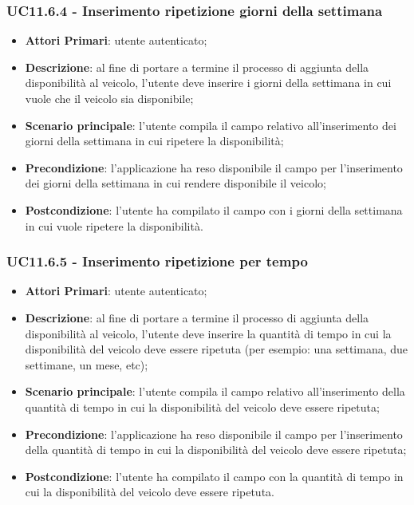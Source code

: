 \subsubsection{UC11.6.4 - Inserimento ripetizione giorni della settimana}
\begin{itemize}
	\item \textbf{Attori Primari}: utente autenticato;
	\item \textbf{Descrizione}: al fine di portare a termine il processo di aggiunta della disponibilità al veicolo, l'utente deve inserire i giorni della settimana in cui vuole che il veicolo sia disponibile;
	\item \textbf{Scenario principale}: l'utente compila il campo relativo all'inserimento dei giorni della settimana in cui ripetere la disponibilità;	
	\item \textbf{Precondizione}: l'applicazione ha reso disponibile il campo per l'inserimento dei giorni della settimana in cui rendere disponibile il veicolo;
	\item \textbf{Postcondizione}: l'utente ha compilato il campo con i giorni della settimana in cui vuole ripetere la disponibilità.	
\end{itemize}
\subsubsection{UC11.6.5 - Inserimento ripetizione per tempo}
\begin{itemize}
	\item \textbf{Attori Primari}: utente autenticato;
	\item \textbf{Descrizione}: al fine di portare a termine il processo di aggiunta della disponibilità al veicolo, l'utente deve inserire la quantità di tempo in cui la disponibilità del veicolo deve essere ripetuta (per esempio: una settimana, due settimane, un mese, etc);
	\item \textbf{Scenario principale}: l'utente compila il campo relativo all'inserimento della quantità di tempo in cui la disponibilità del veicolo deve essere ripetuta;	
	\item \textbf{Precondizione}: l'applicazione ha reso disponibile il campo per l'inserimento della quantità di tempo in cui la disponibilità del veicolo deve essere ripetuta;
	\item \textbf{Postcondizione}: l'utente ha compilato il campo con la quantità di tempo in cui la disponibilità del veicolo deve essere ripetuta.	
\end{itemize}